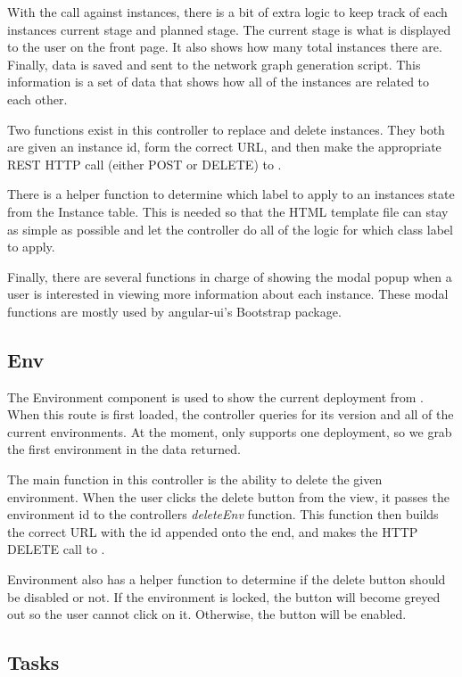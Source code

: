 With the call against \ancor{} instances, there is a bit of extra logic to keep track of each instances current stage and planned stage. The current stage is what is displayed to the user on the front page. It also shows how many total instances there are. Finally, data is saved and sent to the network graph generation script. This information is a set of data that shows how all of the instances are related to each other.

Two functions exist in this controller to replace and delete instances. They both are given an instance id, form the correct URL, and then make the appropriate REST HTTP call (either POST or DELETE) to \ancor{}.

There is a helper function to determine which label to apply to an instances state from the Instance table. This is needed so that the HTML template file can stay as simple as possible and let the controller do all of the logic for which class label to apply.

Finally, there are several functions in charge of showing the modal popup when a user is interested in viewing more information about each instance. These modal functions are mostly used by angular-ui's Bootstrap package.

\subsection{Env}

The Environment component is used to show the current deployment from \ancor{}. When this route is first loaded, the controller queries \ancor{} for its version and all of the current environments. At the moment, \projectName{} only supports one deployment, so we grab the first environment in the data returned.

The main function in this controller is the ability to delete the given environment. When the user clicks the delete button from the view, it passes the environment id to the controllers \emph{deleteEnv} function. This function then builds the correct URL with the id appended onto the end, and makes the HTTP DELETE call to \ancor{}.

Environment also has a helper function to determine if the delete button should be disabled or not. If the environment is locked, the button will become greyed out so the user cannot click on it. Otherwise, the button will be enabled.

\subsection{Tasks}

